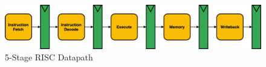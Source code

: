 \begin{figure}[H]
    \includegraphics[draft=false,width=\linewidth]{chapters/chapter4/img/RISC-Datapath.png}
    \caption{5-Stage \gls{RISC} Datapath}
    \label{fig:RISC-Datapath}
\end{figure}